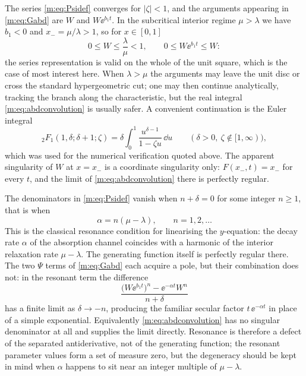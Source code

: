 \begin{remark}
\label{m:rem:domain}
The series \cref{m:eq:Psidef} converges for $|\zeta|<1$, and the arguments appearing
in \cref{m:eq:Gabd} are $W$ and $W\ee^{b_1t}$. In the subcritical interior regime
$\mu>\lambda$ we have $b_1<0$ and $x_- = \mu/\lambda>1$, so for $x\in[0,1]$
\begin{equation*}
0\le W\le\frac{\lambda}{\mu}<1,
\qquad
0\le W\ee^{b_1t}\le W :
\end{equation*}
the series representation is valid on the whole of the unit square, which is the
case of most interest here. When $\lambda>\mu$ the arguments may leave the unit disc
or cross the standard hypergeometric cut; one may then continue analytically,
tracking the branch along the characteristic, but the real integral
\cref{m:eq:abdconvolution} is usually safer. A convenient continuation is the Euler
integral
\begin{equation*}
{}_2F_1(1,\delta;\delta+1;\zeta) = \delta\int_0^1\frac{u^{\delta-1}}{1-\zeta u}\,\dd u
\qquad(\delta>0,\ \zeta\notin[1,\infty)),
\end{equation*}
which was used for the numerical verification quoted above. The apparent
singularity of $W$ at $x=x_-$ is a coordinate singularity only: $F(x_-,t)=x_-$ for
every $t$, and the limit of \cref{m:eq:abdconvolution} there is perfectly regular.
\end{remark}

\begin{remark}[Resonance]
\label{m:rem:resonance}
The denominators in \cref{m:eq:Psidef} vanish when $n+\delta=0$ for some integer
$n\ge1$, that is when
\begin{equation}
\label{m:eq:resonance}
\alpha = n(\mu-\lambda),\qquad n=1,2,\dots
\end{equation}
This is the classical resonance condition for linearising the $y$-equation: the
decay rate $\alpha$ of the absorption channel coincides with a harmonic of the
interior relaxation rate $\mu-\lambda$. The generating function itself is perfectly
regular there. The two $\Psi$ terms of \cref{m:eq:Gabd} each acquire a pole, but
their combination does not: in the resonant term the difference
\begin{equation*}
\frac{\bigl(W\ee^{b_1t}\bigr)^{n} - \ee^{-\alpha t}W^{n}}{n+\delta}
\end{equation*}
has a finite limit as $\delta\to-n$, producing the familiar secular factor
$t\,\ee^{-\alpha t}$ in place of a simple exponential. Equivalently
\cref{m:eq:abdconvolution} has no singular denominator at all and supplies the limit
directly. Resonance is therefore a defect of the separated antiderivative, not of
the generating function; the resonant parameter values form a set of measure zero,
but the degeneracy should be kept in mind when $\alpha$ happens to sit near an
integer multiple of $\mu-\lambda$.
\end{remark}

